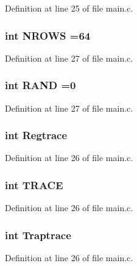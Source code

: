 Definition at line 25 of file main.\+c.

\subsubsection[{N\+R\+O\+WS}]{\setlength{\rightskip}{0pt plus 5cm}int N\+R\+O\+WS =64}\label{main_8c_a3b8c90730100048e219ae18a925eab22}


Definition at line 27 of file main.\+c.

\subsubsection[{R\+A\+ND}]{\setlength{\rightskip}{0pt plus 5cm}int R\+A\+ND =0}\label{main_8c_a189a26e268458e3db1ef6c84efa993d4}


Definition at line 27 of file main.\+c.

\subsubsection[{Regtrace}]{\setlength{\rightskip}{0pt plus 5cm}int Regtrace}\label{main_8c_a38daff3d696277a81716a8200f659a21}


Definition at line 26 of file main.\+c.

\subsubsection[{T\+R\+A\+CE}]{\setlength{\rightskip}{0pt plus 5cm}int T\+R\+A\+CE}\label{main_8c_a231cbc535bda364aa70c8d0617211a65}


Definition at line 26 of file main.\+c.

\subsubsection[{Traptrace}]{\setlength{\rightskip}{0pt plus 5cm}int Traptrace}\label{main_8c_a652034e5a9e2bb432b8f4c841d0834ab}


Definition at line 26 of file main.\+c.

